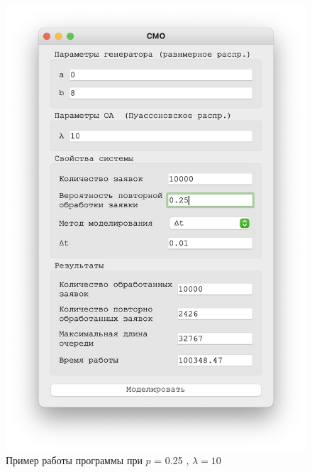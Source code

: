 \begin{figure}[!htb]
\begin{minipage}{0.55\textwidth}
      \includegraphics[width=1\linewidth]{10-25-t}
    \end{minipage}
    \caption{Пример работы программы при $p$ = 0.25 , $\lambda = 10$}
 \end{figure}


